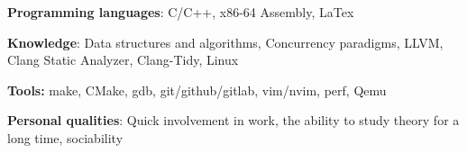 \textbf{Programming languages}: C/C++, x86-64 Assembly, LaTex

\textbf{Knowledge}: Data structures and algorithms, Concurrency paradigms, LLVM, Clang Static Analyzer, Clang-Tidy, Linux

\textbf{Tools:} make, CMake, gdb, git/github/gitlab, vim/nvim, perf, Qemu

\textbf{Personal qualities}: Quick involvement in work, the ability to study theory for a long time, sociability